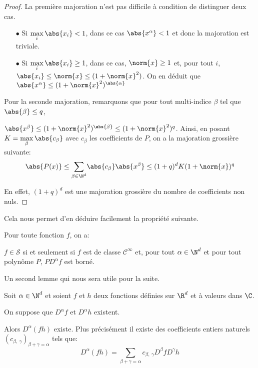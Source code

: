 \begin{proof}
La première majoration n'est pas difficile à condition de distinguer deux cas. 
\begin{itemize}
\item[$\bullet$] 
Si $\max \limits_{i} \abs{x_i}<1$, dans ce cas $\abs{x^\alpha} < 1$ et donc la majoration est triviale.
\item[$\bullet$] 
Si $\max \limits_{i} \abs{x_i} \geq 1$, dans ce cas, $\norm{x} \geq 1$  et, pour tout $i$, $\abs{x_i} \leq \norm{x} \leq (1+\norm{x}^2)$. On en déduit que $\abs{x^\alpha} \leq (1+\norm{x}^2)^{\abs{\alpha}}$
\end{itemize}

Pour la seconde majoration, remarquons que pour tout multi-indice $\beta$ tel que $\abs{\beta} \leq q$, 

$\abs{x^\beta} \leq (1+\norm{x}^2)^{\abs{\beta}} \leq (1+\norm{x}^2)^{q}$. Ainsi, en posant $K = \max \limits_{\beta} \abs{c_{\beta}}$ avec $c_{\beta}$ les coefficients de $P$, on a la majoration grossière suivante:
\[
\abs{P(x)} \leq \displaystyle{\sum \limits_{\beta \in \N^d}} \abs{c_{\beta}} \abs{x^{\beta}} \leq (1+q)^d K (1+\norm{x})^q
\]

En effet, $(1+q)^d$ est une majoration grossière du nombre de coefficients non nuls.
\end{proof}

Cela nous permet d'en déduire facilement la propriété suivante.

\begin{prop}
Pour toute fonction $f$, on a:

\medskip
$f \in \mathcal{S}$ si et seulement si $f$ est de classe $\mathcal{C}^{\infty}$ et, pour tout $\alpha \in \N^d$ et pour tout polynôme $P$, $P D^{\alpha} f$ est borné.
\end{prop}

Un second lemme qui nous sera utile pour la suite.

\begin{lem}
Soit $\alpha \in \N^d$ et soient $f$ et $h$ deux fonctions définies sur $\R^d$ et à valeurs dans $\C$. 

\medskip
On suppose que $D^{\alpha} f$ et $D^{\alpha} h$ existent.

\medskip
Alors $D^{\alpha} (fh)$ existe. Plus précisément il existe des coefficients entiers naturels $(c_{\beta,~\gamma})_{\beta  + \gamma= \alpha}$ tels que:
\[
D^{\alpha} (fh) = \displaystyle{\sum \limits_{\beta + \gamma = \alpha}} c_{\beta,~\gamma} D^{\beta} f D^{\gamma} h
\]
\end{lem}


